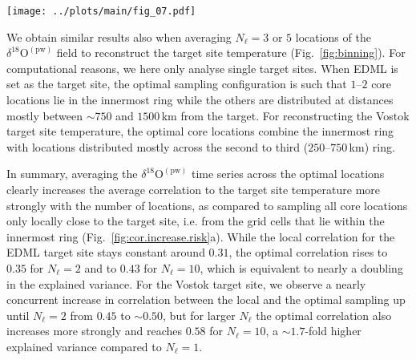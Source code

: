 \documentclass[cp, manuscript]{copernicus}
\begin{document}
\begin{figure*}[t]%
\centering
\texttt{[image: ../plots/main/fig\_07.pdf]}
\caption{%
  The optimal arrangement for averaging three or five
  $\delta^{18}\mathrm{O}^{\mathrm{(pw)}}$ ice cores to reconstruct the target
  site temperature at the EDML (\textbf{a}, \textbf{c}) and Vostok (\textbf{b},
  \textbf{d}) drilling sites. Displayed are subsets of the sampling correlation
  structures for $N_{\ell}=3$ and $5$, showing along the vertical axis the
  optimal five of all possible combinations of rings (best denoted as rank 1,
  fifth best as rank 5), i.e., those which exhibit the five highest mean
  correlation values across $10^5$ random trials of averaging $N_{\ell}=3$
  (\textbf{a}, \textbf{b}) or $N_{\ell}=5$ (\textbf{c}, \textbf{d}) grid cells
  from these rings. The ring bin borders are marked by thin vertical lines with
  their distances from the target site given on the horizontal axes; the
  selected optimal ring combinations are marked as black dots. Systematically,
  arrangements which combine ice cores from the innermost ring with ice cores
  further away are found to be optimal, with larger distances for the EDML
  target site.}
\label{fig:binning}%
\end{figure*}%

We obtain similar results also when averaging $N_{\ell}=3$ or $5$ locations of
the $\delta^{18}\mathrm{O}^{\mathrm{(pw)}}$ field to reconstruct the target site
temperature (Fig.~\ref{fig:binning}). For computational reasons, we here only
analyse single target sites. When EDML is set as the target site, the optimal
sampling configuration is such that $1$--$2$ core locations lie in the innermost
ring while the others are distributed at distances mostly between $\sim750$ and
$1500$\,km from the target. For reconstructing the Vostok target site
temperature, the optimal core locations combine the innermost ring with
locations distributed mostly across the second to third ($250$--$750$\,km) ring.

In summary, averaging the $\delta^{18}\mathrm{O}^{\mathrm{(pw)}}$ time series
across the optimal locations clearly increases the average correlation to the
target site temperature more strongly with the number of locations, as compared
to sampling all core locations only locally close to the target site, i.e. from
the grid cells that lie within the innermost ring
(Fig.~\ref{fig:cor.increase.risk}a). While the local correlation for the EDML
target site stays constant around $0.31$, the optimal correlation rises to
$0.35$ for $N_{\ell}=2$ and to $0.43$ for $N_{\ell}=10$, which is equivalent to
nearly a doubling in the explained variance. For the Vostok target site, we
observe a nearly concurrent increase in correlation between the local and the
optimal sampling up until $N_{\ell}=2$ from $0.45$ to $\sim0.50$, but for larger
$N_{\ell}$ the optimal correlation also increases more strongly and reaches
$0.58$ for $N_{\ell}=10$, a $\sim1.7$-fold higher explained variance compared to
$N_{\ell}=1$.
\end{document}
